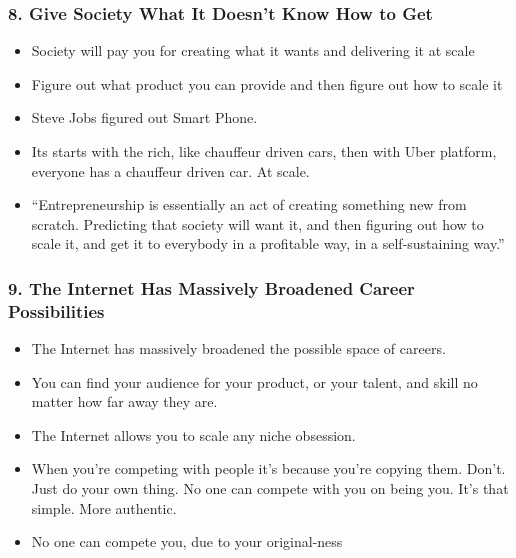 \begin{frame}[fragile]
\frametitle{8. Give Society What It Doesn’t Know How to Get}
\begin{itemize}
\item Society will pay you for creating what it wants and delivering it at scale
\item Figure out what product you can provide and then figure out how to scale it
\item Steve Jobs figured out Smart Phone.
\item Its starts with the rich, like chauffeur driven cars, then with Uber platform, everyone has a chauffeur driven car. At scale.
\item ``Entrepreneurship is essentially an act of creating something new from scratch. Predicting that society will want it, and then figuring out how to scale it, and get it to everybody in a profitable way, in a self-sustaining way.''
\end{itemize}
\end{frame}

\begin{frame}[fragile]
\frametitle{9. The Internet Has Massively Broadened Career Possibilities}
\begin{itemize}
\item The Internet has massively broadened the possible space of careers.
\item You can find your audience for your product, or your talent, and skill no matter how far away they are.
\item The Internet allows you to scale any niche obsession.
\item When you’re competing with people it’s because you’re copying them. Don't.  Just do your own thing. No one can compete with you on being you. It’s that simple. More authentic. 
\item No one can compete you, due to your original-ness
\end{itemize}
\end{frame}


